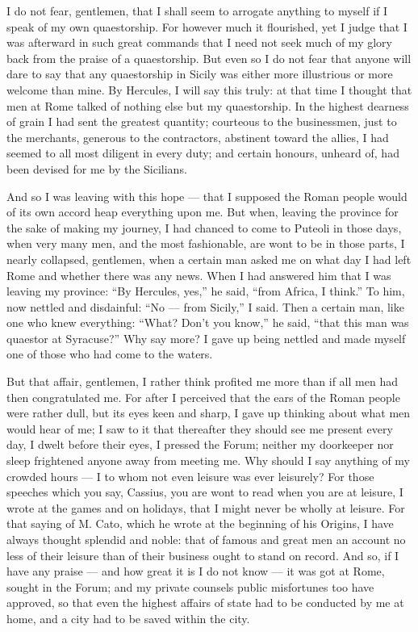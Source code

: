  I do not fear, gentlemen, that I shall seem to arrogate anything to myself if I speak of my own quaestorship. For however much it flourished, yet I judge that I was afterward in such great commands that I need not seek much of my glory back from the praise of a quaestorship. But even so I do not fear that anyone will dare to say that any quaestorship in Sicily was either more illustrious or more welcome than mine. By Hercules, I will say this truly: at that time I thought that men at Rome talked of nothing else but my quaestorship. In the highest dearness of grain I had sent the greatest quantity; courteous to the businessmen, just to the merchants, generous to the contractors, abstinent toward the allies, I had seemed to all most diligent in every duty; and certain honours, unheard of, had been devised for me by the Sicilians.

 And so I was leaving with this hope --- that I supposed the Roman people would of its own accord heap everything upon me. But when, leaving the province for the sake of making my journey, I had chanced to come to Puteoli in those days, when very many men, and the most fashionable, are wont to be in those parts, I nearly collapsed, gentlemen, when a certain man asked me on what day I had left Rome and whether there was any news. When I had answered him that I was leaving my province: ``By Hercules, yes,'' he said, ``from Africa, I think.'' To him, now nettled and disdainful: ``No --- from Sicily,'' I said. Then a certain man, like one who knew everything: ``What? Don't you know,'' he said, ``that this man was quaestor at Syracuse?'' Why say more? I gave up being nettled and made myself one of those who had come to the waters.

 But that affair, gentlemen, I rather think profited me more than if all men had then congratulated me. For after I perceived that the ears of the Roman people were rather dull, but its eyes keen and sharp, I gave up thinking about what men would hear of me; I saw to it that thereafter they should see me present every day, I dwelt before their eyes, I pressed the Forum; neither my doorkeeper nor sleep frightened anyone away from meeting me. Why should I say anything of my crowded hours --- I to whom not even leisure was ever leisurely? For those speeches which you say, Cassius, you are wont to read when you are at leisure, I wrote at the games and on holidays, that I might never be wholly at leisure. For that saying of M. Cato, which he wrote at the beginning of his Origins, I have always thought splendid and noble: that of famous and great men an account no less of their leisure than of their business ought to stand on record. And so, if I have any praise --- and how great it is I do not know --- it was got at Rome, sought in the Forum; and my private counsels public misfortunes too have approved, so that even the highest affairs of state had to be conducted by me at home, and a city had to be saved within the city.

